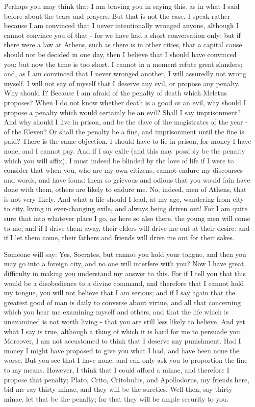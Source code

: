 Perhaps you may think that I am braving you in saying this, as in
what I said before about the tears and prayers. But that is not the
case. I speak rather because I am convinced that I never intentionally
wronged anyone, although I cannot convince you of that - for we have
had a short conversation only; but if there were a law at Athens,
such as there is in other cities, that a capital cause should not
be decided in one day, then I believe that I should have convinced
you; but now the time is too short. I cannot in a moment refute great
slanders; and, as I am convinced that I never wronged another, I will
assuredly not wrong myself. I will not say of myself that I deserve
any evil, or propose any penalty. Why should I? Because I am afraid
of the penalty of death which Meletus proposes? When I do not know
whether death is a good or an evil, why should I propose a penalty
which would certainly be an evil? Shall I say imprisonment? And why
should I live in prison, and be the slave of the magistrates of the
year - of the Eleven? Or shall the penalty be a fine, and imprisonment
until the fine is paid? There is the same objection. I should have
to lie in prison, for money I have none, and I cannot pay. And if
I say exile (and this may possibly be the penalty which you will affix),
I must indeed be blinded by the love of life if I were to consider
that when you, who are my own citizens, cannot endure my discourses
and words, and have found them so grievous and odious that you would
fain have done with them, others are likely to endure me. No, indeed,
men of Athens, that is not very likely. And what a life should I lead,
at my age, wandering from city to city, living in ever-changing exile,
and always being driven out! For I am quite sure that into whatever
place I go, as here so also there, the young men will come to me;
and if I drive them away, their elders will drive me out at their
desire: and if I let them come, their fathers and friends will drive
me out for their sakes. 

Someone will say: Yes, Socrates, but cannot you hold your tongue,
and then you may go into a foreign city, and no one will interfere
with you? Now I have great difficulty in making you understand my
answer to this. For if I tell you that this would be a disobedience
to a divine command, and therefore that I cannot hold my tongue, you
will not believe that I am serious; and if I say again that the greatest
good of man is daily to converse about virtue, and all that concerning
which you hear me examining myself and others, and that the life which
is unexamined is not worth living - that you are still less likely
to believe. And yet what I say is true, although a thing of which
it is hard for me to persuade you. Moreover, I am not accustomed to
think that I deserve any punishment. Had I money I might have proposed
to give you what I had, and have been none the worse. But you see
that I have none, and can only ask you to proportion the fine to my
means. However, I think that I could afford a minae, and therefore
I propose that penalty; Plato, Crito, Critobulus, and Apollodorus,
my friends here, bid me say thirty minae, and they will be the sureties.
Well then, say thirty minae, let that be the penalty; for that they
will be ample security to you. 

